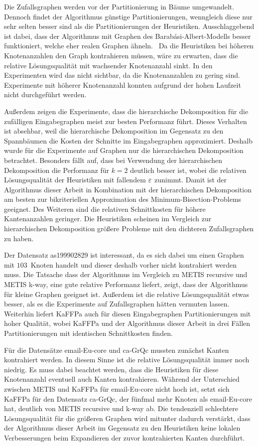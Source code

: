 Die Zufallsgraphen werden vor der Partitionierung in Bäume umgewandelt. 
Dennoch findet der Algorithmus günstige Partitionierungen, wenngleich diese nur sehr selten besser sind als die Partitionierungen der Heuristiken.
Ausschlaggebend ist dabei, dass der Algorithmus mit Graphen des Barabási-Albert-Modells besser funktioniert, welche eher realen Graphen ähneln.~\cite{AB02}
Da die Heuristiken bei höheren Knotenanzahlen den Graph kontrahieren müssen, wäre zu erwarten, dass die relative Lösungsqualität mit wachsender Knotenanzahl sinkt.
In den Experimenten wird das nicht sichtbar, da die Knotenanzahlen zu gering sind.
Experimente mit höherer Knotenanzahl konnten aufgrund der hohen Laufzeit nicht durchgeführt werden.

Außerdem zeigen die Experimente, dass die hierarchische Dekomposition für die zufälligen Eingabegraphen meist zur besten Performanz führt.
Dieses Verhalten ist absehbar, weil die hierarchische Dekomposition im Gegensatz zu den Spannbäumen die Kosten der Schnitte im Eingabegraphen approximiert.
Deshalb wurde für die Experimente auf Graphen nur die hierarchischen Dekomposition betrachtet.
Besonders fällt auf, dass bei Verwendung der hierarchischen Dekomposition die Performanz für $k=2$ deutlich besser ist, wobei die relativen Lösungsqualität der Heuristiken mit fallendem $\varepsilon$ zunimmt.
Damit ist der Algorithmus dieser Arbeit in Kombination mit der hierarchischen Dekomposition am besten zur bikriteriellen Approximation des Minimum-Bisection-Problems geeignet.
Des Weiteren sind die relativen Schnittkosten für höhere Kantenanzahlen geringer.
Die Heuristiken scheinen im Vergleich zur hierarchischen Dekomposition größere Probleme mit den dichteren Zufallsgraphen zu haben.

Der Datensatz as199902829 ist interessant, da es sich dabei um einen Graphen mit $103$~Knoten handelt und dieser deshalb vorher nicht kontrahiert werden muss.
Die Tatsache dass der Algorithmus im Vergleich zu METIS recursive und METIS k-way, eine gute relative Performanz liefert, zeigt, dass der Algorithmus für kleine Graphen geeignet ist.
Außerdem ist die relative Lösungsqualität etwas besser, als es die Experimente auf Zufallsgraphen hätten vermuten lassen.
Weiterhin liefert KaFFPa auch für diesen Eingabegraphen Partitionierungen mit hoher Qualität, wobei KaFFPa und der Algorithmus dieser Arbeit in drei Fällen Partitionierungen mit identischen Schnittkosten finden.

Für die Datensätze email-Eu-core und ca-GrQc mussten zunächst Kanten kontrahiert werden.
In diesem Sinne ist die relative Lösungsqualität immer noch niedrig.
Es muss dabei beachtet werden, dass die Heuristiken für diese Knotenanzahl eventuell auch Kanten kontrahieren.
Während der Unterschied zwischen METIS und KaFFPa für email-Eu-core nicht hoch ist, setzt sich KaFFPa für den Datensatz ca-GrQc, der fünfmal mehr Knoten als email-Eu-core hat, deutlich von METIS recursive und k-way ab.
Die tendenziell schlechtere Lösungsqualität für die größeren Graphen wird mitunter dadurch verstärkt, dass der Algorithmus dieser Arbeit im Gegensatz zu den Heuristiken keine lokalen Verbesserungen beim Expandieren der zuvor kontrahierten Kanten durchführt.

